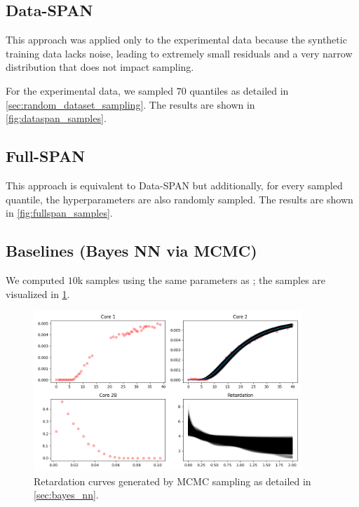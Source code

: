 \documentclass{article}
\begin{document}
\subsection{Data-SPAN}
This approach was applied only to the experimental data because the synthetic training data lacks noise, leading to extremely small residuals and a very narrow distribution that does not impact sampling.

For the experimental data, we sampled $70$ quantiles as detailed in \ref{sec:random_dataset_sampling}. The results are shown in \ref{fig:dataspan_samples}.



\subsection{Full-SPAN}
This approach is equivalent to Data-SPAN but additionally, for every sampled quantile, the hyperparameters are also randomly sampled. The results are shown in \ref{fig:fullspan_samples}.


\subsection{Baselines (Bayes NN via MCMC)}
We computed $10$k samples using the same parameters as \textcite{finn}; the samples are visualized in \ref{fig:mcmc_samples}.

\begin{figure}
    \centering
    \includegraphics[width=0.9\textwidth]{figs/finn_mcmc_samples.png}
    \caption{Retardation curves generated by MCMC sampling as detailed in \ref{sec:bayes_nn}.}
    \label{fig:mcmc_samples}
\end{figure}
\end{document}
